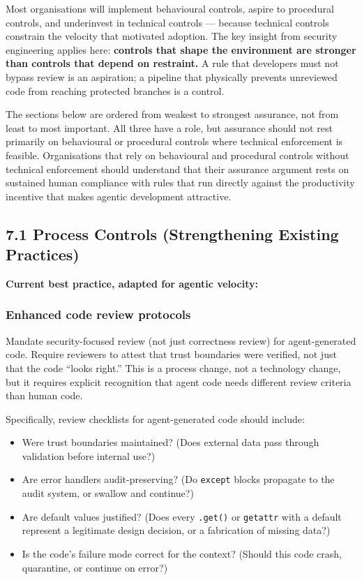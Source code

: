 \documentclass[a4paper,11pt]{report}
\providecommand{\tightlist}{%
  \setlength{\itemsep}{0pt}\setlength{\parskip}{0pt}}
\begin{document}
Most organisations will implement behavioural controls, aspire to
procedural controls, and underinvest in technical controls --- because
technical controls constrain the velocity that motivated adoption. The
key insight from security engineering applies here: \textbf{controls
that shape the environment are stronger than controls that depend on
restraint.} A rule that developers must not bypass review is an
aspiration; a pipeline that physically prevents unreviewed code from
reaching protected branches is a control.

The sections below are ordered from weakest to strongest assurance, not
from least to most important. All three have a role, but assurance
should not rest primarily on behavioural or procedural controls where
technical enforcement is feasible. Organisations that rely on
behavioural and procedural controls without technical enforcement should
understand that their assurance argument rests on sustained human
compliance with rules that run directly against the productivity
incentive that makes agentic development attractive.

\hypertarget{process-controls-strengthening-existing-practices}{%
\subsection{7.1 Process Controls (Strengthening Existing
Practices)}\label{process-controls-strengthening-existing-practices}}

\textbf{Current best practice, adapted for agentic velocity:}

\hypertarget{enhanced-code-review-protocols}{%
\subsubsection{Enhanced code review
protocols}\label{enhanced-code-review-protocols}}

Mandate security-focused review (not just correctness review) for
agent-generated code. Require reviewers to attest that trust boundaries
were verified, not just that the code ``looks right.'' This is a process
change, not a technology change, but it requires explicit recognition
that agent code needs different review criteria than human code.

Specifically, review checklists for agent-generated code should include:

\begin{itemize}
\tightlist
\item
  Were trust boundaries maintained? (Does external data pass through
  validation before internal use?)
\item
  Are error handlers audit-preserving? (Do \texttt{except} blocks
  propagate to the audit system, or swallow and continue?)
\item
  Are default values justified? (Does every \texttt{.get()} or
  \texttt{getattr} with a default represent a legitimate design
  decision, or a fabrication of missing data?)
\item
  Is the code's failure mode correct for the context? (Should this code
  crash, quarantine, or continue on error?)
\end{itemize}
\end{document}
